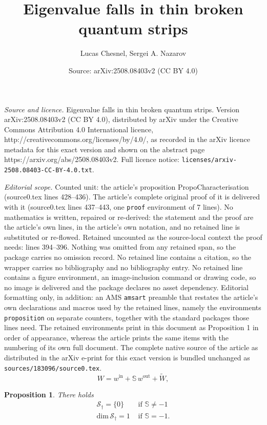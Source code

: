 \documentclass[10pt,a4paper]{amsart}
\title{Eigenvalue falls in thin broken quantum strips}
\author{Lucas Chesnel, Sergei A. Nazarov}
\date{Source: arXiv:2508.08403v2 (CC BY 4.0)}
\newtheorem{proposition}{Proposition}
\renewcommand{\dim}{\mrm{dim}}
\newcommand{\mX}{\mathscr{S}}
\newcommand{\mrm}[1]{\mathrm{#1}}
\begin{document}
\maketitle

\noindent\emph{Source and licence.} Eigenvalue falls in thin broken quantum strips. Version arXiv:2508.08403v2 (CC BY 4.0), distributed by arXiv under the Creative Commons Attribution 4.0 International licence, http://creativecommons.org/licenses/by/4.0/, as recorded in the arXiv licence metadata for this exact version and shown on the abstract page https://arxiv.org/abs/2508.08403v2. Full licence notice: \texttt{licenses/arxiv-2508.08403-CC-BY-4.0.txt}.\par\smallskip

\noindent\textit{Editorial scope.} Counted unit: the article's proposition PropoCharacterisation (source0.tex lines 428--436). The article's complete original proof of it is delivered with it (source0.tex lines 437--443, one \texttt{proof} environment of 7 lines). No mathematics is written, repaired or re-derived: the statement and the proof are the article's own lines, in the article's own notation, and no retained line is substituted or re-flowed.  Retained uncounted as the source-local context the proof needs: lines 394--396.  Nothing was omitted from any retained span, so the package carries no omission record.  No retained line contains a citation, so the wrapper carries no bibliography and no bibliography entry.  No retained line contains a figure environment, an image-inclusion command or drawing code, so no image is delivered and the package declares no asset dependency.  Editorial formatting only, in addition: an AMS \texttt{amsart} preamble that restates the article's own declarations and macros used by the retained lines, namely the environments \texttt{proposition} on separate counters, together with the standard packages those lines need.  The retained environments print in this document as Proposition 1 in order of appearance, whereas the article prints the same items with the numbering of its own full document.  The complete native source of the article as distributed in the arXiv e-print for this exact version is bundled unchanged as \texttt{sources/183096/source0.tex}.
\begin{equation}\label{ScaSol}
W  = w^{\mrm{in}}+\mathbb{S}\,w^{\mrm{out}}+\widetilde{W},
\end{equation}

\begin{proposition}\label{PropoCharacterisation}
There holds
\[
\begin{array}{|ll}
\mX_{\dagger}=\{0\}&\mbox{ if }\mathbb{S}\ne-1\\[2pt]
\dim\,\mX_{\dagger}=1 &\mbox{ if }\mathbb{S}=-1.
\end{array}
\]
\end{proposition}
\end{document}
